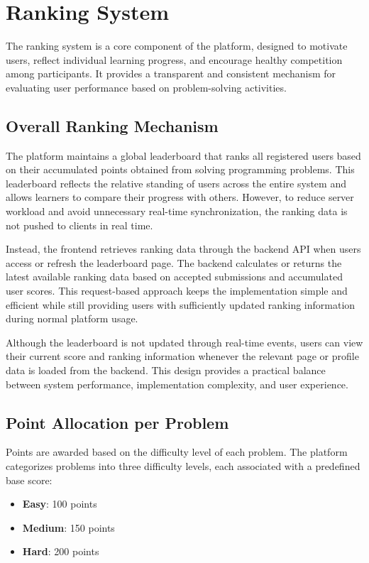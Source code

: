 \section{Ranking System}

The ranking system is a core component of the platform, designed to motivate users, reflect individual learning progress, and encourage healthy competition among participants. It provides a transparent and consistent mechanism for evaluating user performance based on problem-solving activities.

\subsection*{Overall Ranking Mechanism}

The platform maintains a global leaderboard that ranks all registered users based on their accumulated points obtained from solving programming problems. This leaderboard reflects the relative standing of users across the entire system and allows learners to compare their progress with others. However, to reduce server workload and avoid unnecessary real-time synchronization, the ranking data is not pushed to clients in real time.

Instead, the frontend retrieves ranking data through the backend API when users access or refresh the leaderboard page. The backend calculates or returns the latest available ranking data based on accepted submissions and accumulated user scores. This request-based approach keeps the implementation simple and efficient while still providing users with sufficiently updated ranking information during normal platform usage.

Although the leaderboard is not updated through real-time events, users can view their current score and ranking information whenever the relevant page or profile data is loaded from the backend. This design provides a practical balance between system performance, implementation complexity, and user experience.

\subsection*{Point Allocation per Problem}

Points are awarded based on the difficulty level of each problem. The platform categorizes problems into three difficulty levels, each associated with a predefined base score:
\begin{itemize}
    \item \textbf{Easy}: 100 points
    \item \textbf{Medium}: 150 points
    \item \textbf{Hard}: 200 points
\end{itemize}

